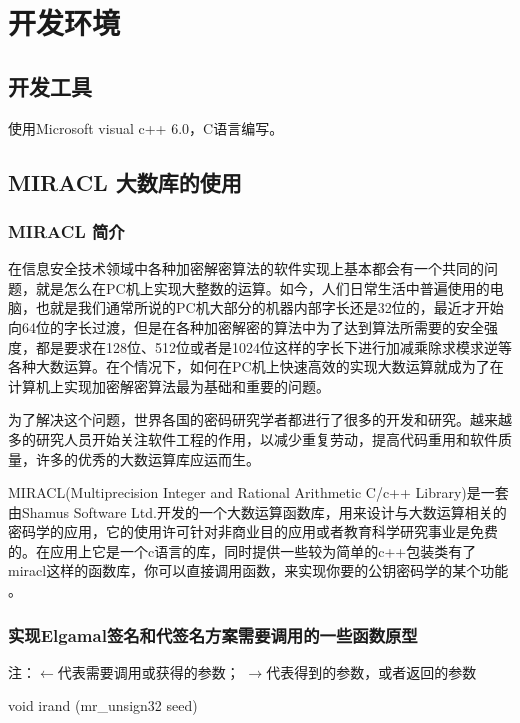 \section{开发环境}

\subsection{开发工具}

使用Microsoft visual c++ 6.0，C语言编写。

\subsection{MIRACL 大数库的使用}

\subsubsection{MIRACL 简介}

在信息安全技术领域中各种加密解密算法的软件实现上基本都会有一个共同的问题，就是怎么在PC机上实现大整数的运算。如今，人们日常生活中普遍使用的电脑，也就是我们通常所说的PC机大部分的机器内部字长还是32位的，最近才开始向64位的字长过渡，但是在各种加密解密的算法中为了达到算法所需要的安全强度，都是要求在128位、512位或者是1024位这样的字长下进行加减乘除求模求逆等各种大数运算。在个情况下，如何在PC机上快速高效的实现大数运算就成为了在计算机上实现加密解密算法最为基础和重要的问题。

为了解决这个问题，世界各国的密码研究学者都进行了很多的开发和研究。越来越多的研究人员开始关注软件工程的作用，以减少重复劳动，提高代码重用和软件质量，许多的优秀的大数运算库应运而生。

MIRACL(Multiprecision Integer and Rational Arithmetic C/c++ Library)是一套由Shamus Software Ltd.开发的一个大数运算函数库，用来设计与大数运算相关的密码学的应用，它的使用许可针对非商业目的应用或者教育科学研究事业是免费的。在应用上它是一个c语言的库，同时提供一些较为简单的c++包装类有了miracl这样的函数库，你可以直接调用函数，来实现你要的公钥密码学的某个功能 \cite{cyu282}。

\subsubsection{实现Elgamal签名和代签名方案需要调用的一些函数原型}

注：$\leftarrow$代表需要调用或获得的参数； $\rightarrow$代表得到的参数，或者返回的参数

void irand (mr\_unsign32 seed)

